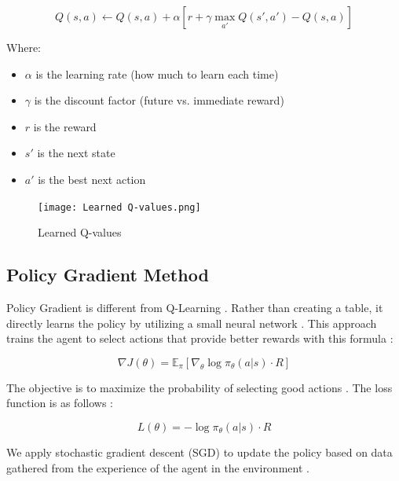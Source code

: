 \documentclass[conference]{IEEEtran}
\begin{document}
\begin{equation}
Q(s,a) \leftarrow Q(s,a) + \alpha[r + \gamma\max_{a'}Q(s',a') - Q(s,a)]
\end{equation}

Where:
\begin{itemize}
\item $\alpha$ is the learning rate (how much to learn each time) \cite{Melo2001}
\item $\gamma$ is the discount factor (future vs. immediate reward) \cite{SuttonBarto2018}
\item $r$ is the reward \cite{Ng1999}
\item $s'$ is the next state \cite{SuttonBarto2018}
\item $a'$ is the best next action \cite{Watkins1992}
\end{itemize}

\begin{figure}[H]
    \centering
    \begin{minipage}{0.48\textwidth}
        \centering
        \texttt{[image: Learned Q-values.png]}
        \caption{Learned Q-values}
        \label{fig:Learned_Q-values}
    \end{minipage}
    \hfill
\end{figure}

\subsection{Policy Gradient Method}
Policy Gradient is different from Q-Learning \cite{Williams1992}. Rather than creating a table, it directly learns the policy by utilizing a small neural network \cite{Mnih2015}. This approach trains the agent to select actions that provide better rewards with this formula \cite{Sutton2000}:

\begin{equation}
\nabla J(\theta) = \mathbb{E}_\pi \left[ \nabla_\theta \log \pi_\theta(a|s) \cdot R \right]
\end{equation}

The objective is to maximize the probability of selecting good actions \cite{Kakade2002}. The loss function is as follows \cite{Williams1992}:

\begin{equation}
L(\theta) = -\log \pi_\theta(a|s) \cdot R
\end{equation}

We apply stochastic gradient descent (SGD) to update the policy based on data gathered from the experience of the agent in the environment \cite{Sutton2000}.
\end{document}

